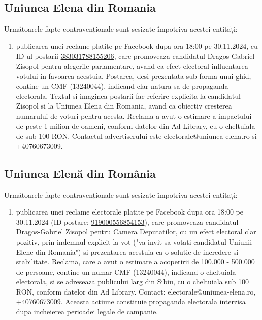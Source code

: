 \documentclass[a4paper,12pt]{article}
\begin{document}
\vspace{0.5cm}

\subsection{Uniunea Elena din Romania}
Următoarele fapte contravenționale sunt sesizate împotriva acestei entități:

\begin{enumerate}[leftmargin=*, label=\arabic*.)]
    \item publicarea unei reclame platite pe Facebook dupa ora 18:00 pe 30.11.2024, cu ID-ul postarii \href{https://www.facebook.com/ads/library/?id=383031788155206}{383031788155206}, care promoveaza candidatul Dragos-Gabriel Zisopol pentru alegerile parlamentare, avand ca efect electoral influentarea votului in favoarea acestuia. Postarea, desi prezentata sub forma unui ghid, contine un CMF (13240044), indicand clar natura sa de propaganda electorala.  Textul si imaginea postarii fac referire explicita la candidatul Zisopol si la Uniunea Elena din Romania, avand ca obiectiv cresterea numarului de voturi pentru acesta.  Reclama a avut o estimare a impactului de peste 1 milion de oameni, conform datelor din Ad Library, cu o cheltuiala de sub 100 RON.  Contactul advertiserului este electorale@uniunea-elena.ro si +40760673009.
\end{enumerate}

\vspace{0.5cm}

\subsection{Uniunea Elenă din România}
Următoarele fapte contravenționale sunt sesizate împotriva acestei entități:

\begin{enumerate}[leftmargin=*, label=\arabic*.)]
    \item publicarea unei reclame electorale platite pe Facebook dupa ora 18:00 pe 30.11.2024 (ID postare: \href{https://www.facebook.com/ads/library/?id=919000556854153}{919000556854153}), care promoveaza candidatul Dragos-Gabriel Zisopol pentru Camera Deputatilor, cu un efect electoral clar pozitiv, prin indemnul explicit la vot ("va invit sa votati candidatul Uniunii Elene din Romania") si prezentarea acestuia ca o solutie de incredere si stabilitate.  Reclama, care a avut o estimare a acoperirii de 100.000 - 500.000 de persoane,  contine un numar CMF (13240044), indicand o cheltuiala electorala, si se adreseaza publicului larg din Sibiu, cu o cheltuiala sub 100 RON, conform datelor din Ad Library.  Contact: electorale@uniunea-elena.ro, +40760673009.  Aceasta actiune constituie propaganda electorala interzisa dupa incheierea perioadei legale de campanie.
\end{enumerate}
\end{document}
